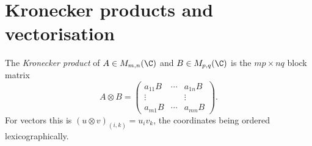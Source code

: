 \section{Kronecker products and vectorisation}

\begin{definition}\label{def:kronecker}
The \emph{Kronecker product} of $A\in M_{m,n}(\C)$ and $B\in M_{p,q}(\C)$ is the $mp\times nq$ block matrix
\[
A\otimes B=\begin{pmatrix}a_{11}B&\cdots&a_{1n}B\\\vdots&&\vdots\\a_{m1}B&\cdots&a_{mn}B\end{pmatrix}.
\]
For vectors this is $(u\otimes v)_{(i,k)}=u_iv_k$, the coordinates being ordered lexicographically.
\end{definition}


